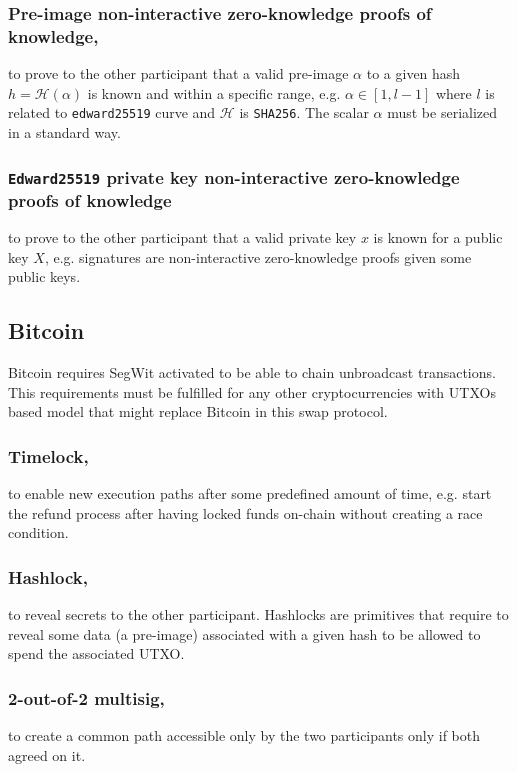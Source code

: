 \documentclass{llncs}
\begin{document}
\subsubsection{Pre-image non-interactive zero-knowledge proofs of knowledge,}
to prove to the other participant that a valid pre-image $\alpha$ to a given hash $h = \mathcal{H}(\alpha)$ is known and within a specific range, e.g. $\alpha \in [1, l-1]$ where $l$ is related to \texttt{edward25519} curve and $\mathcal{H}$ is \texttt{SHA256}. The scalar $\alpha$ must be serialized in a standard way.

\subsubsection{\texttt{Edward25519} private key non-interactive zero-knowledge proofs of knowledge}
to prove to the other participant that a valid private key $x$ is known for a public key $X$, e.g. signatures are non-interactive zero-knowledge proofs given some public keys.

\subsection{Bitcoin}
Bitcoin requires SegWit activated to be able to chain unbroadcast transactions. This requirements must be fulfilled for any other cryptocurrencies with UTXOs based model that might replace Bitcoin in this swap protocol.

\subsubsection{Timelock,}
to enable new execution paths after some predefined amount of time, e.g. start the refund process after having locked funds on-chain without creating a race condition.

\subsubsection{Hashlock,}
to reveal secrets to the other participant. Hashlocks are primitives that require to reveal some data (a pre-image) associated with a given hash to be allowed to spend the associated UTXO.

\subsubsection{2-out-of-2 multisig,}
to create a common path accessible only by the two participants only if both agreed on it.
\end{document}
